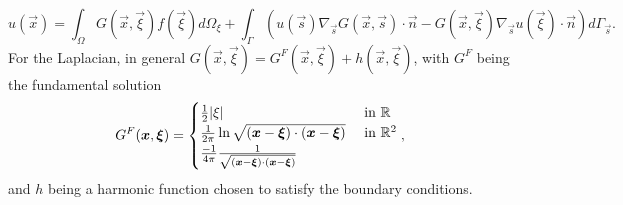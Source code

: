 \begin{equation*}
    u(\vec{x})=\int_{\Omega}G(\vec{x},\vec{\xi})f(\vec{\xi})d\Omega_{\xi}+\int_{\Gamma}(u(\vec{s})\nabla_{\vec{s}}G(\vec{x},\vec{s})\cdot\vec{n}-G(\vec{x},\vec{\xi})\nabla_{\vec{s}}u(\vec{\xi})\cdot\vec{n})d\Gamma_{\vec{s}}.
\end{equation*}
For the Laplacian, in general $G(\vec{x},\vec{\xi})=G^{F}(\vec{x},\vec{\xi})+h(\vec{x},\vec{\xi})$, with $G^F$ being the fundamental solution 
\begin{equation*}
    G^F(\vec x, \vec\xi) = \begin{cases}
        \frac{1}{2}|\xi|&\text{ in }\R\\
        \frac{1}{2\pi}\ln\sqrt{(\vec x -\vec \xi)\cdot(\vec x - \vec \xi)} &\text{ in }\R^2\\
        \frac{-1}{4\pi} \frac{1}{\sqrt{(\vec x -\vec \xi)\cdot(\vec x - \vec \xi)}}
    \end{cases},
\end{equation*}
and $h$ being a harmonic function chosen to satisfy the boundary conditions.